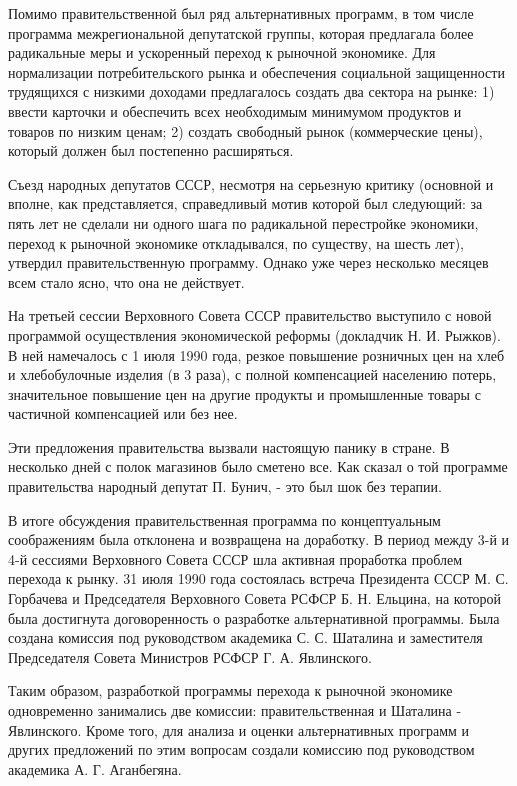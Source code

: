 \documentclass{article}
\begin{document}
Помимо правительственной был ряд альтернативных программ, в том числе программа межрегиональной депутатской группы, которая предлагала более радикальные меры и ускоренный переход к рыночной экономике. Для нормализации потребительского рынка и обеспечения социальной защищенности трудящихся с низкими доходами предлагалось создать два сектора на рынке: 1) ввести карточки и обеспечить всех необходимым минимумом продуктов и товаров по низким ценам; 2) создать свободный рынок (коммерческие цены), который должен был постепенно расширяться.

\hfill

Съезд народных депутатов СССР, несмотря на серьезную критику (основной и вполне, как представляется, справедливый мотив которой был следующий: за пять лет не сделали ни одного шага по радикальной перестройке экономики, переход к рыночной экономике откладывался, по существу, на шесть лет), утвердил правительственную программу. Однако уже через несколько месяцев всем стало ясно, что она не действует.

\hfill

На третьей сессии Верховного Совета СССР правительство выступило с новой программой осуществления экономической реформы (докладчик Н. И. Рыжков). В ней намечалось с 1 июля 1990 года, резкое повышение розничных цен на хлеб и хлебобулочные изделия (в 3 раза), с полной компенсацией населению потерь, значительное повышение цен на другие продукты и промышленные товары с частичной компенсацией или без нее.

\hfill

Эти предложения правительства вызвали настоящую панику в стране. В несколько дней с полок магазинов было сметено все. Как сказал о той программе правительства народный депутат П. Бунич, - это был шок без терапии.

В итоге обсуждения правительственная программа по концептуальным соображениям была отклонена и возвращена на доработку. В период между 3-й и 4-й сессиями Верховного Совета СССР шла активная проработка проблем перехода к рынку. 31 июля 1990 года состоялась встреча Президента СССР М. С. Горбачева и Председателя Верховного Совета РСФСР Б. Н. Ельцина, на которой была достигнута договоренность о разработке альтернативной программы. Была создана комиссия под руководством академика С. С. Шаталина и заместителя Председателя Совета Министров РСФСР Г. А. Явлинского.

\hfill

Таким образом, разработкой программы перехода к рыночной экономике одновременно занимались две комиссии: правительственная и Шаталина - Явлинского. Кроме того, для анализа и оценки альтернативных программ и других предложений по этим вопросам создали комиссию под руководством академика А. Г. Аганбегяна.
\end{document}
